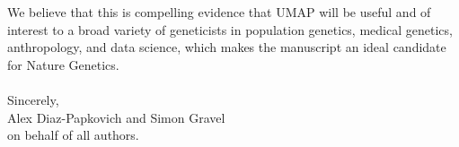 \documentclass{article}
\begin{document}
We believe that this is compelling evidence that UMAP will be useful and of interest to a broad variety of geneticists in population genetics, medical genetics, anthropology, and data science, which makes the manuscript an ideal candidate for Nature Genetics.
\\
\\
Sincerely,
\\
Alex Diaz-Papkovich and Simon Gravel
\\
on behalf of all authors.
\end{document}
